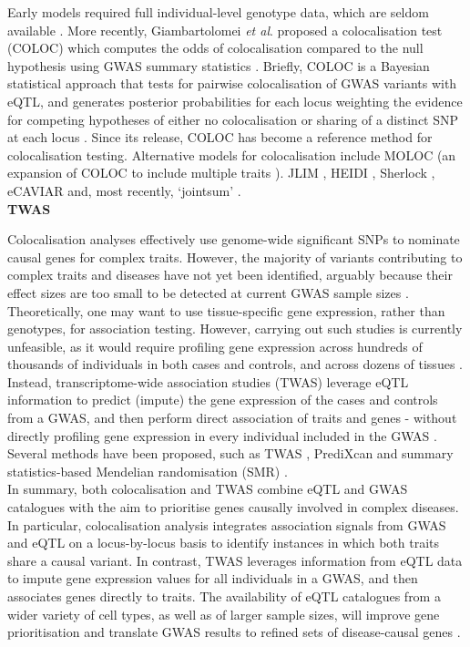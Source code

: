 Early models \cite{plagnol2009statistical, wallace2012statistical, nica2010candidate} required full individual-level genotype data, which are seldom available \cite{cano2020gwas}.
More recently, Giambartolomei \textit{et al}. proposed a  colocalisation test (COLOC) which computes the odds of colocalisation compared to the null hypothesis using GWAS summary statistics \cite{giambartolomei2014bayesian}. 
Briefly, COLOC is a Bayesian statistical approach that tests for pairwise colocalisation of GWAS variants with eQTL, and generates posterior probabilities for each locus weighting the evidence for competing hypotheses of either no colocalisation or sharing of a distinct SNP at each locus \cite{guo2015integration}.
Since its release, COLOC has become a reference method for colocalisation testing. 
Alternative models for colocalisation include 
MOLOC (an expansion of COLOC to include multiple traits \cite{giambartolomei2018bayesian}).
JLIM \cite{chun2017limited}, 
HEIDI \cite{zhu2016integration}, 
Sherlock \cite{he2013sherlock},
eCAVIAR \cite{hormozdiari2016colocalization} 
and, most recently, `jointsum' \cite{deng2020powerful}.\\

\textbf{TWAS}

Colocalisation analyses effectively use genome-wide significant SNPs to nominate causal genes for complex traits. 
However, the majority of variants contributing to complex traits and diseases have not yet been identified, arguably because their effect sizes are too small to be detected at current GWAS sample sizes \cite{visscher201710}.
Theoretically, one may want to use tissue-specific gene expression, rather than genotypes, for association testing.
However, carrying out such studies is currently unfeasible, as it would require profiling gene expression across hundreds of thousands of individuals in both cases and controls, and across dozens of tissues \cite{cano2020gwas}.
Instead, transcriptome-wide association studies (TWAS) leverage eQTL information to predict (impute) the gene expression of the cases and controls from a GWAS, and then perform direct association of traits and genes - without directly profiling gene expression in every individual included in the GWAS \cite{wainberg2019opportunities}.
Several methods have been proposed, such as TWAS \cite{gusev2016integrative}, PrediXcan \cite{gamazon2015gene} and summary statistics-based Mendelian randomisation (SMR) \cite{zhu2016integration}. \\

In summary, both colocalisation and TWAS combine eQTL and GWAS catalogues with the aim to prioritise genes causally involved in complex diseases.
In particular, colocalisation analysis integrates association signals from GWAS and eQTL on a locus-by-locus basis to identify instances in which both traits share a causal variant. 
In contrast, TWAS leverages information from eQTL data to impute gene expression values for all individuals in a GWAS, and then associates genes directly to traits. 
The availability of eQTL catalogues from a wider variety of cell types, as well as of larger sample sizes, will improve gene prioritisation and translate GWAS results to refined sets of disease-causal genes \cite{cano2020gwas}.


